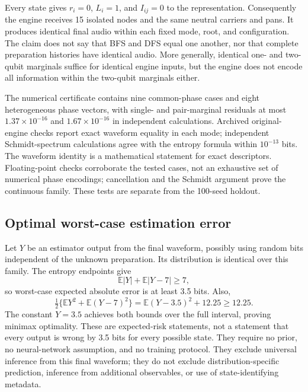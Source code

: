 \documentclass[11pt,a4paper]{article}
\begin{document}
Every state gives $r_i=0$, $L_i=1$, and $I_{ij}=0$ to the representation. Consequently the engine receives 15 isolated nodes and the same neutral carriers and pans. It produces identical final audio within each fixed mode, root, and configuration. The claim does not say that BFS and DFS equal one another, nor that complete preparation histories have identical audio. More generally, identical one- and two-qubit marginals suffice for identical engine inputs, but the engine does not encode all information within the two-qubit marginals either.

The numerical certificate contains nine common-phase cases and eight heterogeneous phase vectors, with single- and pair-marginal residuals at most $1.37\times10^{-16}$ and $1.67\times10^{-16}$ in independent calculations. Archived original-engine checks report exact waveform equality in each mode; independent Schmidt-spectrum calculations agree with the entropy formula within $10^{-13}$ bits. The waveform identity is a mathematical statement for exact descriptors. Floating-point checks corroborate the tested cases, not an exhaustive set of numerical phase encodings; cancellation and the Schmidt argument prove the continuous family. These tests are separate from the 100-seed holdout.

\subsection{Optimal worst-case estimation error}
Let $Y$ be an estimator output from the final waveform, possibly using random bits independent of the unknown preparation. Its distribution is identical over this family. The entropy endpoints give
\[
\mathbb E|Y|+\mathbb E|Y-7|\ge7,
\]
so worst-case expected absolute error is at least 3.5 bits. Also,
\[
\tfrac12\{\mathbb E Y^2+\mathbb E(Y-7)^2\}=\mathbb E(Y-3.5)^2+12.25\ge12.25.
\]
The constant $Y=3.5$ achieves both bounds over the full interval, proving minimax optimality. These are expected-risk statements, not a statement that every output is wrong by 3.5 bits for every possible state. They require no prior, no neural-network assumption, and no training protocol. They exclude universal inference from this final waveform; they do not exclude distribution-specific prediction, inference from additional observables, or use of state-identifying metadata.
\end{document}
